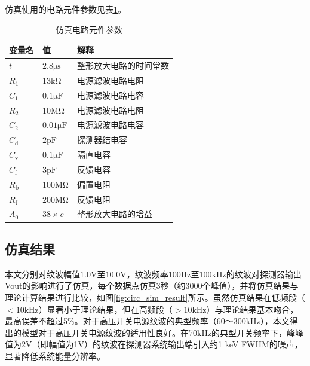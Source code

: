 \documentclass[twocolumn]{ctexart}
\begin{document}
仿真使用的电路元件参数见表\ref{tab:params}。

\begin{table}[htbp]
    \centering
    \caption{仿真电路元件参数}
    \label{tab:params}
    \begin{tabular}{lll}
        \hline
        变量名 & 值 & 解释 \\
        \hline
        $t$ & $2.8 \mathrm{\mu s}$ & 整形放大电路的时间常数 \\
        $R_1$ & $13 \mathrm{k\Omega}$ & 电源滤波电路电阻 \\
        $C_1$ & $0.1 \mathrm{\mu F}$ & 电源滤波电路电容 \\
        $R_2$ & $10 \mathrm{M\Omega}$ & 电源滤波电路电阻 \\
        $C_2$ & $0.01 \mathrm{\mu F}$ & 电源滤波电路电容 \\
        $C_{\mathrm{d}}$ & $2\text{pF}$ & 探测器结电容 \\
        $C_{\mathrm{x}}$ & $0.1\mathrm{\mu F}$ & 隔直电容 \\
        $C_{\mathrm{f}}$ & $3 \mathrm{pF}$ & 反馈电容 \\
        $R_{\mathrm{b}}$ & $100 \mathrm{M\Omega}$ & 偏置电阻 \\
        $R_{\mathrm{f}}$ & $200 \mathrm{M\Omega}$ & 反馈电阻 \\
        $A_0$ & $38 \times e$ & 整形放大电路的增益 \\
        \hline
    \end{tabular}
\end{table}

\subsection{仿真结果}

本文分别对纹波幅值$1.0\mathrm{V}$至$10.0\mathrm{V}$，纹波频率$100\mathrm{Hz}$至$100\mathrm{kHz}$的纹波对探测器输出Vout的影响进行了仿真，每个数据点仿真3秒（约3000个峰值），并将仿真结果与理论计算结果进行比较，如图\ref{fig:circ_sim_result}所示。虽然仿真结果在低频段（$<10\mathrm{kHz}$）显著小于理论结果，但在高频段（$>10\mathrm{kHz}$）与理论结果基本吻合，最高误差不超过5\%。对于高压开关电源纹波的典型频率（60～300kHz）\cite{15}，本文得出的模型对于高压开关电源纹波的适用性良好。在70kHz的典型开关频率下，峰峰值为2V（即幅值为1V）的纹波在探测器系统输出端引入约1 keV FWHM的噪声，显著降低系统能量分辨率。
\end{document}
